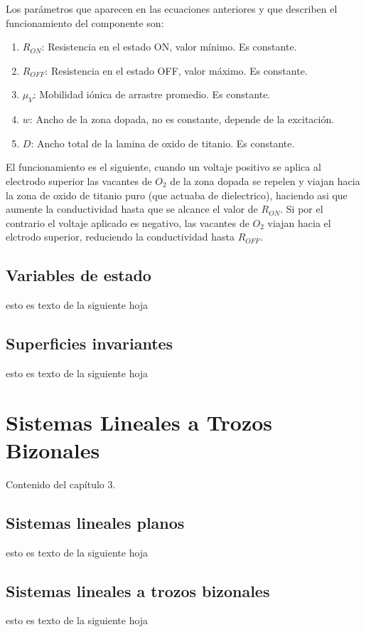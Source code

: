 \documentclass[12pt,a4paper]{report} %
\begin{document}
	Los parámetros que aparecen en las ecuaciones anteriores y que describen el funcionamiento del componente son:
	
	\begin{enumerate}
		\item $R_{ON}$: Resistencia en el estado ON, valor mínimo. Es constante.
		\item $R_{OFF}$: Resistencia en el estado OFF, valor máximo. Es constante.
		\item $\mu_V$: Mobilidad iónica de arrastre promedio. Es constante.
		\item $w$: Ancho de la zona dopada, no es constante, depende de la excitación.
		\item $D$: Ancho total de la lamina de oxido de titanio. Es constante.
	\end{enumerate}
	
	El funcionamiento es el siguiente, cuando un voltaje positivo se aplica al electrodo superior las vacantes de $O_2$ de la zona dopada se repelen y viajan hacia la zona de oxido de titanio puro (que actuaba de dielectrico), haciendo asi que aumente la conductividad hasta que se alcance el valor de $R_{ON}$. Si por el contrario el voltaje aplicado es negativo, las vacantes de $O_2$ viajan hacia el elctrodo superior, reduciendo la conductividad hasta $R_{OFF}$.	
	\newpage
	\section{Variables de estado}
	esto es texto de la siguiente hoja
	\newpage
	\section{Superficies invariantes}
	esto es texto de la siguiente hoja
	
	\chapter{Sistemas Lineales a Trozos Bizonales}
	Contenido del capítulo 3.
	\newpage
	\section{Sistemas lineales planos}
	esto es texto de la siguiente hoja
	\newpage
	\section{Sistemas lineales a trozos bizonales}
	esto es texto de la siguiente hoja
	
\end{document}
